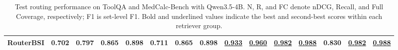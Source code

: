\begin{table}[t]
\begin{tabular*}{\textwidth}{@{\extracolsep{\fill}}lrrrrrrrrrrrrrr@{}}
RouterBSI & \textbf{0.702} & \textbf{0.797} & \textbf{0.865} & \textbf{0.898} & \textbf{0.711} & \textbf{0.865} & \textbf{0.898} & \underline{0.933} & \underline{0.960} & \underline{0.982} & \underline{0.988} & 0.830 & \underline{0.982} & \underline{0.988} \\
\bottomrule
\end{tabular*}
\caption{Test routing performance on ToolQA and MedCalc-Bench with Qwen3.5-4B. N, R, and FC denote nDCG, Recall, and Full Coverage, respectively; F1 is set-level F1. Bold and underlined values indicate the best and second-best scores within each retriever group.}
\label{tab:app-routing-2}
\end{table}
